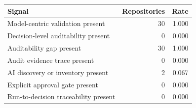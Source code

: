 \begin{tabular}{lrr}
\toprule
Signal & Repositories & Rate \\
\midrule
Model-centric validation present & 30 & 1.000 \\
Decision-level auditability present & 0 & 0.000 \\
Auditability gap present & 30 & 1.000 \\
Audit evidence trace present & 0 & 0.000 \\
AI discovery or inventory present & 2 & 0.067 \\
Explicit approval gate present & 0 & 0.000 \\
Run-to-decision traceability present & 0 & 0.000 \\
\bottomrule
\end{tabular}

